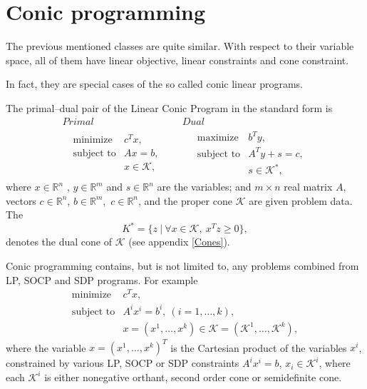 \documentclass[12pt]{book}
\theoremstyle{definition}
\begin{document}
\section{Conic programming}

The previous mentioned classes are quite similar. 
With respect to their variable space, all of them have linear objective, linear constraints and cone constraint.

In fact, they are special cases of the so called conic linear programs.




\label{defConeProg}
The primal--dual pair of the Linear Conic Program in the standard form is  
\begin{equation}
\label{coneProg} 
\begin{array}{cc}
Primal & Dual \\
\ \ \ \begin{array}{ll}
\mbox{minimize} & c^Tx,\\
\mbox{subject to}& Ax = b,\\
& x \in \mathcal{K},
\end{array} 
 \ \ \ \ \ & \ \ \ \ \ 
 \begin{array}{ll}
\mbox{maximize} & b^Ty,\\
\mbox{subject to}& A^Ty + s = c,\\
& s \in \mathcal{K}^*,
\end{array}
\end{array}
\tag{Conic Program}
\end{equation}
where $x\in \mathbb{R}^n$ , $y\in \mathbb{R}^m$ and $s\in \mathbb{R}^n$ are the variables; and $m\times n$ real matrix $A$, vectors $c\in \mathbb{R}^n$, $b\in \mathbb{R}^{m},$ $c\in \mathbb{R}^n$, and the proper cone $\mathcal{K}$ are given problem data. The 
\begin{equation}
{K}^* = \{z\ |\ \forall x\in\mathcal{K}, \ x^Tz\geq 0\},
\end{equation} 
denotes the dual cone of $\mathcal{K}$ (see appendix \ref{Cones}).

Conic programming contains, but is not limited to, any problems combined from LP, SOCP and SDP programs. 
For example 
\begin{equation}
\begin{array}{ll}
\mbox{minimize} & c^Tx,\\
\mbox{subject to}&A^ix^i=b^i, \ (i = 1,\dots ,k),\\
& x=(x^1,\dots ,x^k) \in \mathcal{K} = (\mathcal{K}^1,\dots ,\mathcal{K}^k),
\end{array} 
\end{equation}
where the variable $x=(x^1, \dots, x^k)^T$ is the Cartesian product of the variables $x^i$, constrained by various LP, SOCP or SDP constraints 
$A^ix^i=b$, $x_i\in \mathcal{K}^i$, where each $\mathcal{K}^i$ is either nonegative orthant, second order cone or semidefinite cone.
\end{document}
